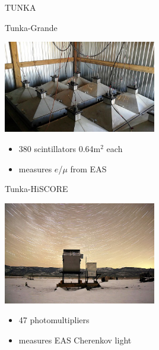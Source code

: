 \begin{frame}{TUNKA}
\vspace{-1ex}
\begin{minipage}[t]{0.48\textwidth}
  \begin{block}{Tunka-Grande}
    \parbox[c][0.22\textheight][t]{0.43\textwidth}{
      \includegraphics[width=0.50\textwidth]{pics/Hiller_Roman-005.jpg}
    }
    \hfill
    \parbox[c][0.22\textheight][t]{0.55\textwidth}{
      \begin{itemize}
        \setlength{\itemsep}{0pt}
        \item 380 scintillators 0.64m$^2$ each
        \item measures $e$/$\mu$ from EAS
      \end{itemize}
    }
  \end{block}
\end{minipage}
\hfill
\begin{minipage}[t]{0.48\textwidth}
  \begin{block}{Tunka-HiSCORE}
    \parbox[c][0.22\textheight][t]{0.43\textwidth}{
      \includegraphics[width=0.50\textwidth]{pics/Tunka-HiSCORE.jpg}
    }
    \hfill
    \parbox[c][0.22\textheight][t]{0.55\textwidth}{
      \begin{itemize}
        \setlength{\itemsep}{0pt}
        \item 47 photomultipliers
        \item measures EAS Cherenkov light
      \end{itemize}
    }
  \end{block}
\end{minipage}
\end{frame}

%
%
